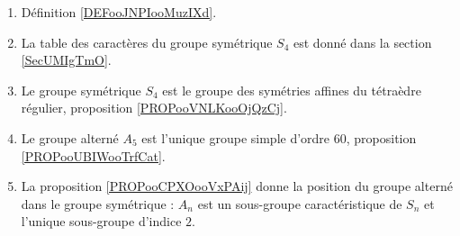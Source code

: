        \label{THEMEooQEEWooXDhvhv}

\begin{enumerate}
    \item
        Définition \ref{DEFooJNPIooMuzIXd}.
    \item
        La table des caractères du groupe symétrique \( S_4\) est donné dans la section \ref{SecUMIgTmO}.
    \item
        Le groupe symétrique \( S_4\) est le groupe des symétries affines du tétraèdre régulier, proposition \ref{PROPooVNLKooOjQzCj}.
    \item
        Le groupe alterné \( A_5\) est l'unique groupe simple d'ordre \( 60\), proposition \ref{PROPooUBIWooTrfCat}.
    \item
        La proposition \ref{PROPooCPXOooVxPAij} donne la position du groupe alterné dans le groupe symétrique : \( A_n\) est un sous-groupe caractéristique de \( S_n\) et l'unique sous-groupe d'indice \( 2\).
\end{enumerate}
